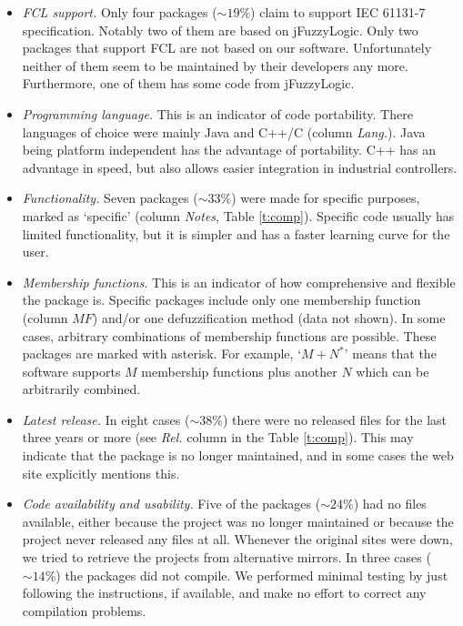 \documentclass[conference]{IEEEtran}
\begin{document}
\begin{itemize}
	\item \textit{FCL support.} Only four packages ($\sim 19\%$) claim to support IEC 61131-7 specification. 
	Notably two of them are based on jFuzzyLogic. 
	Only two packages that support FCL are not based on our software. Unfortunately neither of them seem to be maintained by their developers any more. 
	Furthermore, one of them has some code from jFuzzyLogic.

	\item \textit{Programming language.} This is an indicator of code portability. 
	There languages of choice were mainly Java and C++/C (column \textit{Lang.}). 
	Java being platform independent has the advantage of portability. 
	C++ has an advantage in speed, but also allows easier integration in industrial controllers.
	
	\item \textit{Functionality.} Seven packages ($\sim 33\%$) were made for specific purposes, marked as `specific' (column \textit{Notes}, Table \ref{t:comp}).
	Specific code usually has limited functionality, but it is simpler and has a faster learning curve for the user.

	\item \textit{Membership functions}. This is an indicator of how comprehensive and flexible the package is. 
	Specific packages include only one membership function (column $MF$) and/or one defuzzification method (data not shown). 
	In some cases, arbitrary combinations of membership functions are possible. 
	These packages are marked with asterisk. 
	For example, `$M+N^*$' means that the software supports $M$ membership functions plus another $N$ which can be arbitrarily combined.
	
	\item \textit{Latest release.} In eight cases ($\sim 38\%$) there were no released files for the last three years or more (see \textit{Rel.} column in the Table \ref{t:comp}).
	This may indicate that the package is no longer maintained, and in some cases the web site explicitly mentions this.

	\item \textit{Code availability and usability.} Five of the packages ($\sim 24\%$) had no files available, either because the project was no longer maintained or because the project never released any files at all. 
	Whenever the original sites were down, we tried to retrieve the projects from alternative mirrors.
	In three cases ($\sim 14\%$) the packages did not compile. 
	We performed minimal testing by just following the instructions, if available, and make no effort to correct any compilation problems. 

\end{itemize}
\end{document}
